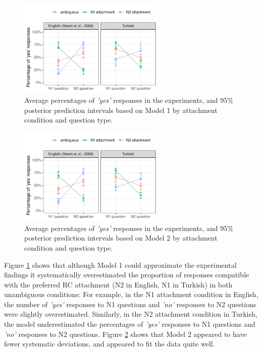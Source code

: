 \documentclass[11pt]{article}\usepackage[]{graphicx}\usepackage[]{color}
\begin{document}
\begin{figure}
\includegraphics[width=7cm]{./figures/post_pred_ahg.pdf}
\caption{Average percentages of \textit{'yes'} responses in the experiments, and $95\%$ posterior prediction intervals based on Model 1 by attachment condition and question type.}
\label{post_pred_ahg}
\end{figure}

\begin{figure}
\includegraphics[width=7cm]{./figures/post_pred_r1r2hg.pdf}
\caption{Average percentages of \textit{'yes'} responses in the experiments, and $95\%$ posterior prediction intervals based on Model 2 by attachment condition and question type.}
\label{post_pred_r1r2hg}
\end{figure}

Figure \ref{post_pred_ahg} shows that although Model 1 could approximate the experimental findings 
it systematically overestimated the proportion of responses compatible with the preferred RC attachment (N2 in English, N1 in Turkish) in both unambiguous conditions: For example, in the N1 attachment condition in English, the number of \textit{'yes'} responses to N1 questions and \textit{'no'} responses to N2 questions were slightly overestimated. Similarly, in the N2 attachment condition in Turkish, the model underestimated the percentages of \textit{'yes'} responses to N1 questions and \textit{'no'} responses to N2 questions. Figure \ref{post_pred_r1r2hg} shows that Model 2 appeared to have fewer systematic deviations, and appeared to fit the data quite well.
\end{document}
